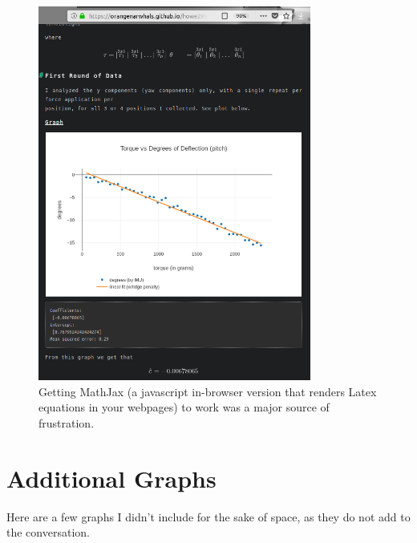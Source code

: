 \documentclass[preprint,12pt,3p]{elsarticle}
\begin{document}
\begin{figure}[H]
\centering
\includegraphics[width=0.8\textwidth]{images/misc/blog_latex.png}
\caption{Getting MathJax (a javascript in-browser version that renders Latex
equations in your webpages) to work was a major source of frustration.}
\end{figure}

\section{Additional Graphs}
\label{appendix-graphs}

Here are a few graphs I didn't include for the sake of space, as they do not add
to the conversation.
\end{document}
